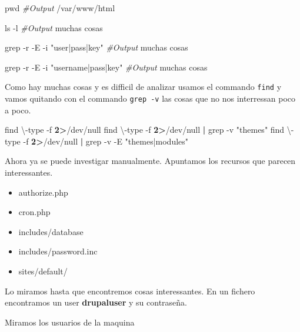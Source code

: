 \documentclass{assets/ipesethesis}
\newenvironment{Shaded}{\begin{snugshade}}{\end{snugshade}}
\newcommand{\BuiltInTok}[1]{#1}
\newcommand{\CommentTok}[1]{\textcolor[rgb]{0.56,0.35,0.01}{\textit{#1}}}
\newcommand{\ExtensionTok}[1]{#1}
\newcommand{\FunctionTok}[1]{\textcolor[rgb]{0.00,0.00,0.00}{#1}}
\newcommand{\KeywordTok}[1]{\textcolor[rgb]{0.13,0.29,0.53}{\textbf{#1}}}
\newcommand{\NormalTok}[1]{#1}
\newcommand{\OperatorTok}[1]{\textcolor[rgb]{0.81,0.36,0.00}{\textbf{#1}}}
\newcommand{\StringTok}[1]{\textcolor[rgb]{0.31,0.60,0.02}{#1}}
\providecommand{\tightlist}{%
  \setlength{\itemsep}{0pt}\setlength{\parskip}{0pt}}
\begin{document}
\begin{Shaded}
\begin{Highlighting}[]
\BuiltInTok{pwd}
\CommentTok{#Output}
\ExtensionTok{/var/www/html}

\FunctionTok{ls}\NormalTok{ -l}
\CommentTok{#Output}
\ExtensionTok{muchas}\NormalTok{ cosas}

\FunctionTok{grep}\NormalTok{ -r -E -i }\StringTok{"user|pass|key"}
\CommentTok{#Output}
\ExtensionTok{muchas}\NormalTok{ cosas}

\FunctionTok{grep}\NormalTok{ -r -E -i }\StringTok{"username|pass|key"}
\CommentTok{#Output}
\ExtensionTok{muchas}\NormalTok{ cosas}
\end{Highlighting}
\end{Shaded}

Como hay muchas cosas y es difficil de analizar usamos el commando \texttt{find} y vamos quitando con el commando \texttt{grep\ -v} las cosas que no
nos interressan poco a poco.

\begin{Shaded}
\begin{Highlighting}[]
\FunctionTok{find}\NormalTok{ \textbackslash{}-type -f }\OperatorTok{2>}\NormalTok{/dev/null}
\FunctionTok{find}\NormalTok{ \textbackslash{}-type -f }\OperatorTok{2>}\NormalTok{/dev/null }\KeywordTok{|} \FunctionTok{grep}\NormalTok{ -v }\StringTok{"themes"}
\FunctionTok{find}\NormalTok{ \textbackslash{}-type -f }\OperatorTok{2>}\NormalTok{/dev/null }\KeywordTok{|} \FunctionTok{grep}\NormalTok{ -v -E }\StringTok{"themes|modules"}
\end{Highlighting}
\end{Shaded}

Ahora ya se puede investigar manualmente. Apuntamos los recursos que parecen interessantes.

\begin{itemize}
\tightlist
\item
  authorize.php
\item
  cron.php
\item
  includes/database
\item
  includes/password.inc
\item
  sites/default/
\end{itemize}

Lo miramos hasta que encontremos cosas interessantes. En un fichero encontramos un user \textbf{drupaluser} y su contraseña.

Miramos los usuarios de la maquina

\begin{Shaded}
\end{Shaded}
\end{document}
